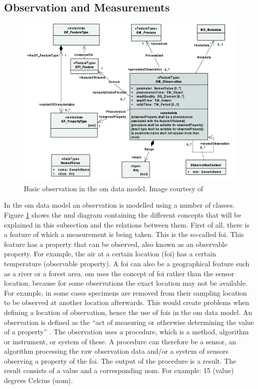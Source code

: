 \subsection{Observation and Measurements}

\begin{figure}
	\centering
	\includegraphics[width=0.8\linewidth]{UML/OM_Observation.png}
	\caption{Basic observation in the \ac*{om} data model. Image courtesy of \cite[p. 9]{SW:ISO}}
	\label{fig:OM_observation}
\end{figure}

In the \acf{om} data model an observation is modelled using a number of classes. Figure \ref{fig:OM_observation} shows the \ac{uml} diagram containing the different concepts that will be explained in this subsection and the relations between them. First of all, there is a feature of which a measurement is being taken. This is the so-called \acf{foi}. This feature has a property that can be observed, also known as an observable property. For example, the air at a certain location (\ac{foi}) has a certain temperature (observable property). A \ac{foi} can also be a geographical feature such as a river or a forest area. \ac{om} uses the concept of \ac{foi} rather than the sensor location, because for some observations the exact location may not be available. For example, in some cases specimens are removed from their sampling location to be observed at another location afterwards. This would create problems when defining a location of observation, hence the use of \aclp{foi} in the \ac{om} data model. An observation is defined as the \enquote{act of measuring or otherwise determining the value of a property} \citep[p. 3]{SW:ISO}. The observation uses a procedure, which is a method, algorithm or instrument, or system of these. A procedure can therefore be a sensor, an algorithm processing the raw observation data and/or a system of sensors observing a property of the \ac{foi}. The output of the procedure is a result. The result consists of a value and a corresponding \acf{uom}. For example: 15 (value) degrees Celcius (\ac{uom}). 


